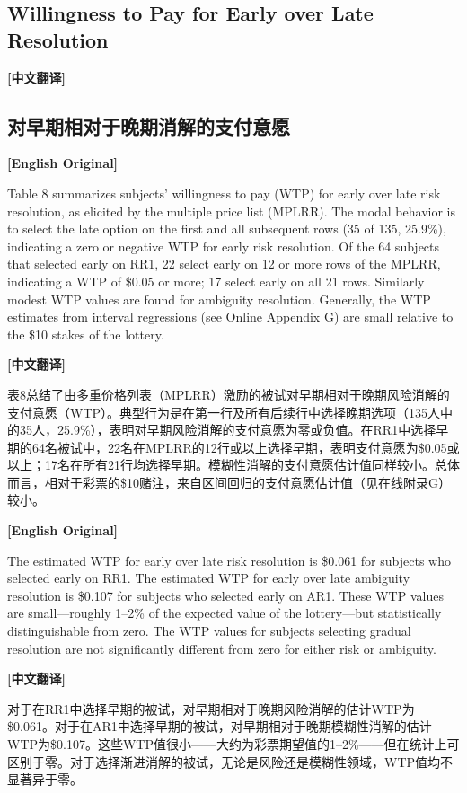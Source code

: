\documentclass[12pt,a4paper]{ctexart}
\newenvironment{original}{%
  \par\medskip\noindent\textbf{[English Original]}\par\smallskip
  \color{black}\small
}{%
  \par\medskip
}
\newenvironment{translation}{%
  \par\noindent\textbf{[中文翻译]}\par\smallskip
  \color{blue}\small
}{%
  \par\bigskip
}
\theoremstyle{definition}
\theoremstyle{remark}
\begin{document}
\subsection{Willingness to Pay for Early over Late Resolution}
\begin{translation}
\subsection*{对早期相对于晚期消解的支付意愿}
\end{translation}

\begin{original}
Table 8 summarizes subjects' willingness to pay (WTP) for early over late risk resolution, as elicited by the multiple price list (MPLRR). The modal behavior is to select the late option on the first and all subsequent rows (35 of 135, 25.9\%), indicating a zero or negative WTP for early risk resolution. Of the 64 subjects that selected early on RR1, 22 select early on 12 or more rows of the MPLRR, indicating a WTP of \$0.05 or more; 17 select early on all 21 rows. Similarly modest WTP values are found for ambiguity resolution. Generally, the WTP estimates from interval regressions (see Online Appendix G) are small relative to the \$10 stakes of the lottery.
\end{original}
\begin{translation}
表8总结了由多重价格列表（MPLRR）激励的被试对早期相对于晚期风险消解的支付意愿（WTP）。典型行为是在第一行及所有后续行中选择晚期选项（135人中的35人，25.9\%），表明对早期风险消解的支付意愿为零或负值。在RR1中选择早期的64名被试中，22名在MPLRR的12行或以上选择早期，表明支付意愿为\$0.05或以上；17名在所有21行均选择早期。模糊性消解的支付意愿估计值同样较小。总体而言，相对于彩票的\$10赌注，来自区间回归的支付意愿估计值（见在线附录G）较小。
\end{translation}

\begin{original}
The estimated WTP for early over late risk resolution is \$0.061 for subjects who selected early on RR1. The estimated WTP for early over late ambiguity resolution is \$0.107 for subjects who selected early on AR1. These WTP values are small---roughly 1--2\% of the expected value of the lottery---but statistically distinguishable from zero. The WTP values for subjects selecting gradual resolution are not significantly different from zero for either risk or ambiguity.
\end{original}
\begin{translation}
对于在RR1中选择早期的被试，对早期相对于晚期风险消解的估计WTP为\$0.061。对于在AR1中选择早期的被试，对早期相对于晚期模糊性消解的估计WTP为\$0.107。这些WTP值很小——大约为彩票期望值的1--2\%——但在统计上可区别于零。对于选择渐进消解的被试，无论是风险还是模糊性领域，WTP值均不显著异于零。
\end{translation}
\end{document}
